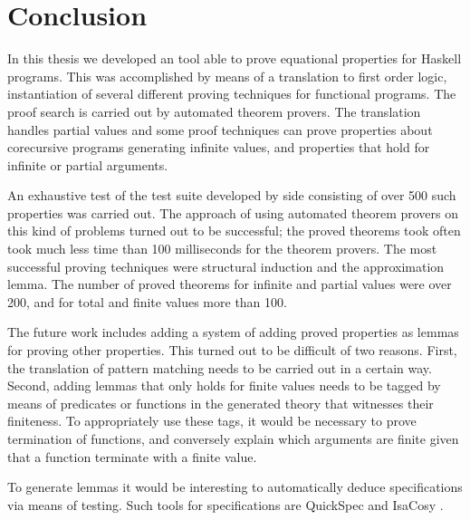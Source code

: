 \chapter{Conclusion}
\label{ch:conclusion}

In this thesis we developed an tool able to prove equational
properties for Haskell programs. This was accomplished by means of a
translation to first order logic, instantiation of several different
proving techniques for functional programs. The proof search is
carried out by automated theorem provers. The translation handles
partial values and some proof techniques can prove properties about
corecursive programs generating infinite values, and properties that
hold for infinite or partial arguments.

An exhaustive test of the test suite developed by side consisting of
over 500 such properties was carried out. The approach of using
automated theorem provers on this kind of problems turned out to be
successful; the proved theorems took often took much less time than
100 milliseconds for the theorem provers. The most successful proving
techniques were structural induction and the approximation lemma. The
number of proved theorems for infinite and partial values were over
200, and for total and finite values more than 100.

The future work includes adding a system of adding proved properties
as lemmas for proving other properties. This turned out to be
difficult of two reasons. First, the translation of pattern matching
needs to be carried out in a certain way. Second, adding lemmas that
only holds for finite values needs to be tagged by means of predicates
or functions in the generated theory that witnesses their
finiteness. To appropriately use these tags, it would be necessary to
prove termination of functions, and conversely explain which arguments
are finite given that a function terminate with a finite value.

To generate lemmas it would be interesting to automatically deduce
specifications via means of testing. Such tools for specifications are
QuickSpec \citep{quickspec} and IsaCosy \citep{isacosy}.
